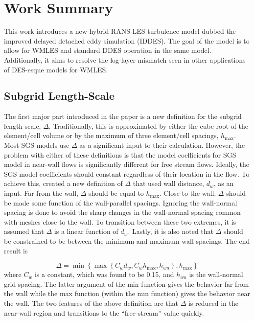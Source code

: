 \documentclass{ucb}
\begin{document}
\section{Work Summary}
This work introduces a new hybrid RANS-LES turbulence model dubbed the improved delayed detached eddy simulation (IDDES). The goal of the model is to allow for WMLES and standard DDES operation in the same model. Additionally, it aims to resolve the log-layer mismatch seen in other applications of DES-esque models for WMLES.

\subsection{Subgrid Length-Scale}
The first major part introduced in the paper is a new definition for the subgrid length-scale, \(\Delta \). Traditionally, this is approximated by either the cube root of the element/cell volume or by the maximum of three element/cell spacings, \(h_{\max} \). Most SGS models use \(\Delta \) as a significant input to their calculation. However, the problem with either of these definitions is that the model coefficients for SGS model in near-wall flows is significantly different for free stream flows. Ideally, the SGS model coefficients should constant regardless of their location in the flow. To achieve this, \citeauthor{shurHybridRANSLESApproach2008} created a new definition of \(\Delta \) that used wall distance, \(d_w \), as an input. Far from the wall, \(\Delta \) should be equal to \( h_{\max} \). Close to the wall, \(\Delta \) should be made some function of the wall-parallel spacings. Ignoring the wall-normal spacing is done to avoid the sharp changes in the wall-normal spacing common with meshes close to the wall. To transition between these two extremes, it is assumed that \(\Delta \) is a linear function of \(d_w \). Lastly, it is also noted that \(\Delta \) should be constrained to be between the minimum and maximum wall spacings. The end result is

\begin{equation}\label{eq:delta}
    \Delta = \min \left \{ 
        \max \left \{ C_w d_w, C_w h_{\max}, h_{wn}\right \} 
        , h_{\max} \right \}
\end{equation}
where \(C_w\) is a constant, which was found to be 0.15, and \(h_{wn} \) is the wall-normal grid spacing. The latter argument of the min function gives the behavior far from the wall while the max function (within the min function) gives the behavior near the wall.
The two features of the above definition are that \(\Delta \) is reduced in the near-wall region and transitions to the ``free-stream'' value quickly. 
\end{document}
